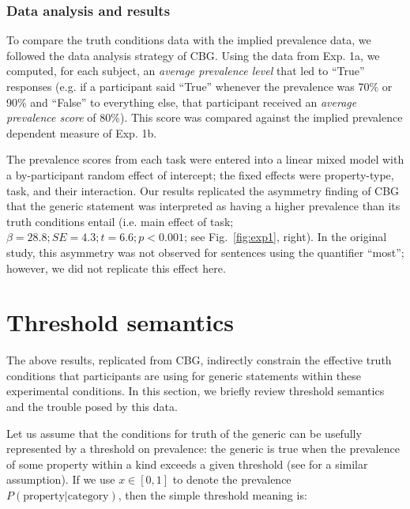 \documentclass[10pt,letterpaper]{article}
\begin{document}
\subsubsection{Data analysis and results}
\label{subsec:cbganalysis}

%
To compare the truth conditions data with the implied prevalence data, we followed the data analysis strategy of CBG. Using the data from Exp. 1a, we computed, for each subject, an \emph{average prevalence level} that led to ``True'' responses (e.g. if a participant said ``True'' whenever the prevalence was 70\% or 90\% and ``False'' to everything else, that participant received an \emph{average prevalence score} of 80\%). This score was compared against the implied prevalence dependent measure of Exp. 1b. 

The prevalence scores from each task were entered into a linear mixed model with a by-participant random effect of intercept; the fixed effects were property-type, task, and their interaction. Our results replicated the asymmetry finding of CBG that the generic statement was interpreted as having a higher prevalence than its truth conditions entail (i.e. main effect of task; $\beta=28.8; SE = 4.3; t=6.6; p < 0.001$; see Fig.~\ref{fig:exp1}, right). In the original study, this asymmetry was not observed for sentences using the quantifier ``most''; however, we did not replicate this effect here.

\section{Threshold semantics}
The above results, replicated from CBG, indirectly constrain the effective truth conditions that participants are using for generic statements within these experimental conditions. In this section, we briefly review threshold semantics and the trouble posed by this data.

Let us assume that the conditions for truth of the generic can be usefully represented by a threshold on prevalence: the generic is true when the prevalence of some property within a kind exceeds a given threshold (see  for a similar assumption). If we use $x\in [0,1]$ to denote the prevalence $P(\text{property}|\text{category})$, then the simple threshold meaning is:
\end{document}
